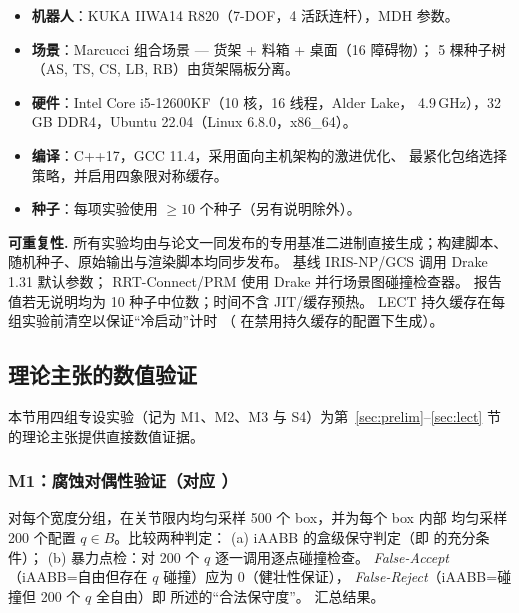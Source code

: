 \documentclass[journal]{IEEEtran}
\begin{document}
\begin{itemize}[nosep]
  \item \textbf{机器人}：KUKA IIWA14 R820（7-DOF，4 活跃连杆），MDH 参数。
  \item \textbf{场景}：Marcucci 组合场景 --- 货架 + 料箱 + 桌面（16 障碍物）；
    5 棵种子树（AS, TS, CS, LB, RB）由货架隔板分离。
  \item \textbf{硬件}：Intel Core i5-12600KF（10 核，16 线程，Alder Lake，
    4.9\,GHz），32\,GB DDR4，Ubuntu 22.04（Linux 6.8.0，x86\_64）。
  \item \textbf{编译}：C++17，GCC 11.4，采用面向主机架构的激进优化、
    最紧化包络选择策略，并启用四象限对称缓存。
  \item \textbf{种子}：每项实验使用 $\geq 10$ 个种子（另有说明除外）。
\end{itemize}

\textbf{可重复性.}
所有实验均由与论文一同发布的专用基准二进制直接生成；构建脚本、随机种子、原始输出与渲染脚本均同步发布。
基线 IRIS-NP/GCS 调用 Drake 1.31 默认参数；
RRT-Connect/PRM 使用 Drake 并行场景图碰撞检查器。
报告值若无说明均为 10 种子中位数；时间不含 JIT/缓存预热。
LECT 持久缓存在每组实验前清空以保证“冷启动”计时
（ 在禁用持久缓存的配置下生成）。

\subsection{理论主张的数值验证}\label{sec:theory_validation}

本节用四组专设实验（记为 M1、M2、M3 与 S4）为第~\ref{sec:prelim}--\ref{sec:lect}
节的理论主张提供直接数值证据。

\subsubsection{M1：腐蚀对偶性验证（对应 ）}
对每个宽度分组，在关节限内均匀采样 500 个 box，并为每个 box 内部
均匀采样 200 个配置 $q\in B$。比较两种判定：
(a) iAABB 的盒级保守判定（即
 的充分条件）；
(b) 暴力点检：对 200 个 $q$ 逐一调用逐点碰撞检查。
\emph{False-Accept}（iAABB=自由但存在 $q$ 碰撞）应为 $0$（健壮性保证），
\emph{False-Reject}（iAABB=碰撞但 200 个 $q$ 全自由）即
 所述的“合法保守度”。 汇总结果。
\end{document}
